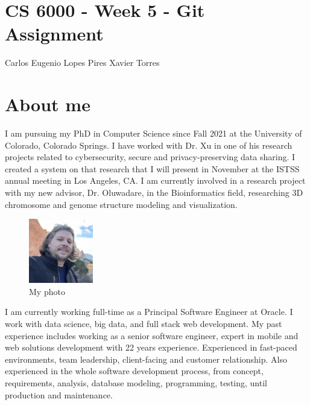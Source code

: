 \hypersetup{colorlinks=true, urlcolor=blue, linkcolor=black}

\newcommand{\myfullname}{Carlos Eugenio Lopes Pires Xavier Torres}
\newcommand{\myshortname}{Carlos E. Torres}

\section{CS 6000 - Week 5 - Git Assignment}

Carlos Eugenio Lopes Pires Xavier Torres



\section{About me}

I am pursuing my PhD in Computer Science since Fall 2021 at the University of Colorado, Colorado Springs. I have worked with Dr. Xu in one of his research projects related to cybersecurity, secure and privacy-preserving data sharing. I created a system on that research that I will present in November at the ISTSS annual meeting in Los Angeles, CA.
I am currently involved in a research project with my new advisor, Dr. Oluwadare, in the Bioinformatics field, researching 3D chromosome and genome structure modeling and visualization.

\begin{figure}
    \centering
    \includegraphics[width=0.25\textwidth]{Torres-F23-photo.jpg}
    \caption{\small My photo}
\end{figure}

I am currently working full-time as a Principal Software Engineer at Oracle. I work with data science, big data, and full stack web development. My past experience includes working as a senior software engineer, expert in mobile and web solutions development with 22 years experience. Experienced in fast-paced environments, team leadership, client-facing and customer relationship. Also experienced in the whole software development process, from concept, requirements, analysis, database modeling, programming, testing, until production and maintenance.

